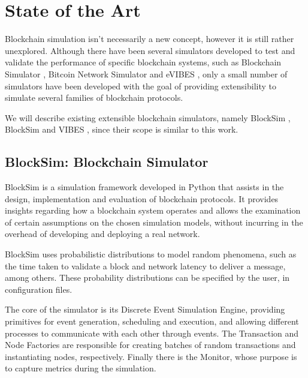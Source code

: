 

\chapter{State of the Art}
\label{cha:state-of-the-art}

Blockchain simulation isn’t necessarily a new concept, however it is still rather unexplored. Although there have been several simulators developed to test and validate the performance of specific blockchain systems, such as Blockchain Simulator \cite{sec_pow_blockchains}, Bitcoin Network Simulator \cite{local_bitcoin_netsim} and eVIBES \cite{evibes}, only a small number of simulators have been developed with the goal of providing extensibility to simulate several families of blockchain protocols.

We will describe existing extensible blockchain simulators, namely BlockSim \cite{blocksim1}, BlockSim \cite{blocksim2} and VIBES \cite{vibes}, since their scope is similar to this work.


\section{BlockSim: Blockchain Simulator}
\label{sec:blocksim1}

BlockSim \cite{blocksim1} is a simulation framework developed in Python that assists in the design, implementation and evaluation of blockchain protocols. It provides insights regarding how a blockchain system operates and allows the examination of certain assumptions on the chosen simulation models, without incurring in the overhead of developing and deploying  a real network.

BlockSim uses probabilistic distributions to model random phenomena, such as the time taken to validate a block and network latency to deliver a message, among others. These probability distributions can be specified by the user, in configuration files.

The core of the simulator is its Discrete Event Simulation Engine, providing primitives for event generation, scheduling and execution, and allowing different processes to communicate with each other through events. The Transaction and Node Factories are responsible for creating batches of random transactions and instantiating nodes, respectively. Finally there is the Monitor, whose purpose is to capture metrics during the simulation.

